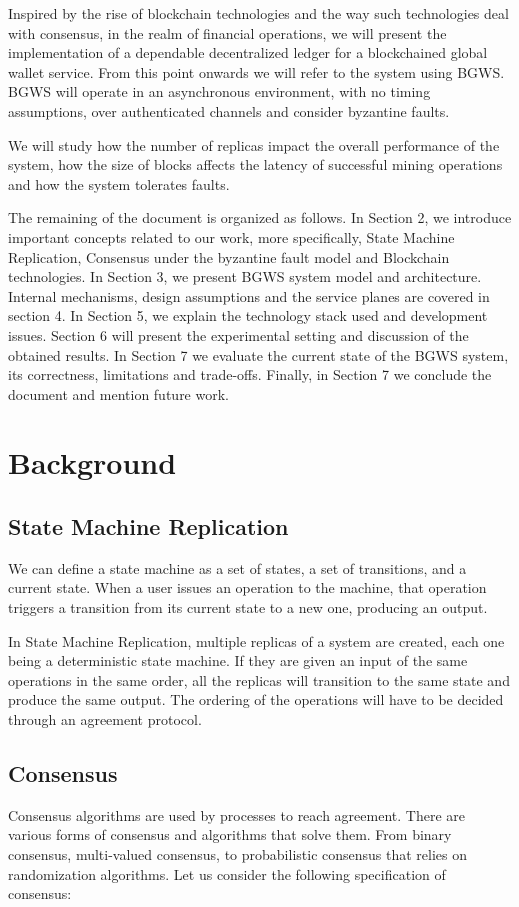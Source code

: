 \documentclass[10pt,journal,compsoc]{IEEEtran}
\begin{document}
	Inspired by the rise of blockchain technologies and the way such technologies deal with consensus, in the realm of financial operations, we will present the implementation of a dependable decentralized ledger for a blockchained global wallet service. From this point onwards we will refer to the system using BGWS.
	BGWS will operate in an asynchronous environment, with no timing assumptions, over authenticated channels and consider byzantine faults. 

	We will study how the number of replicas impact the overall performance of the system, how the size of blocks affects the latency of successful mining operations and how the system tolerates faults.
		
	The remaining of the document is organized as follows.
	In Section 2, we introduce important concepts related to our work, more specifically, State Machine Replication, Consensus under the byzantine fault model and Blockchain technologies.
	In Section 3, we present BGWS system model and architecture.
	Internal mechanisms, design assumptions and the service planes are covered in section 4.
	In Section 5, we explain the technology stack used and development issues.
	Section 6 will present the experimental setting and discussion of the obtained results.
	In Section 7 we evaluate the current state of the BGWS system, its correctness, limitations and trade-offs.
	Finally, in Section 7 we conclude the document and mention future work.
	

	\section{Background}
	\subsection{State Machine Replication}
	We can define a state machine as a set of states, a set of transitions, and a current state. When a user issues an operation to the machine, that operation triggers a transition from its current state to a new one, producing an output. 

	In State Machine Replication, multiple replicas of a system are created, each one being a deterministic state machine. If they are given an input of the same operations in the same order, all the replicas will transition to the same state and produce the same output. The ordering of the operations will have to be decided through an agreement protocol. 

	\subsection{Consensus}
	Consensus algorithms are used by processes to reach agreement. There are various forms of consensus and algorithms that solve them\cite{lamport2001paxos}\cite{raft}. From binary consensus, multi-valued consensus, to probabilistic consensus that relies on randomization algorithms\cite{moniz2008ritas}\cite{moniz2006experimental}. Let us consider the following specification of consensus: 
\end{document}
